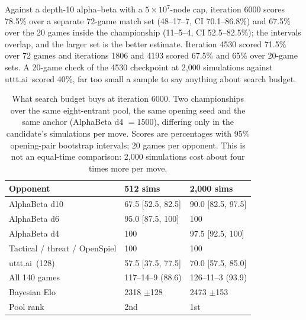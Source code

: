 \documentclass[conference]{IEEEtran}
\newcommand{\utttai}{uttt.ai}
\begin{document}
Against a depth-10 alpha--beta with a $5\times10^{7}$-node cap, iteration
6000 scores 78.5\% over a separate 72-game match set (48--17--7, CI
70.1--86.8\%) and 67.5\% over the 20 games inside the championship
(11--5--4, CI 52.5--82.5\%); the intervals overlap, and the larger set is
the better estimate. Iteration 4530 scored 71.5\% over 72 games and
iterations 1806 and 4193 scored 67.5\% and 65\% over 20-game sets. A
20-game check of the 4530 checkpoint at 2{,}000 simulations against \utttai\
scored 40\%, far too small a sample to say anything about search budget.



\begin{table}[t]
  \centering\footnotesize
  \setlength{\tabcolsep}{4pt}
  \caption{What search budget buys at iteration 6000. Two championships over
  the same eight-entrant pool, the same opening seed and the same anchor
  (AlphaBeta d4 $=1500$), differing only in the candidate's simulations per
  move. Scores are percentages with 95\% opening-pair bootstrap intervals;
  20 games per opponent. This is not an equal-time comparison: 2{,}000
  simulations cost about four times more per move.}
  \label{tab:budget}
  \begin{tabular}{@{}lll@{}}
    \toprule
    Opponent & 512 sims & 2{,}000 sims \\
    \midrule
    AlphaBeta d10 & 67.5 [52.5, 82.5] & 90.0 [82.5, 97.5] \\
    AlphaBeta d6 & 95.0 [87.5, 100] & 100 \\
    AlphaBeta d4 & 100 & 97.5 [92.5, 100] \\
    Tactical / threat / OpenSpiel & 100 & 100 \\
    \utttai\ (128) & 57.5 [37.5, 77.5] & 70.0 [57.5, 85.0] \\
    \midrule
    All 140 games & 117--14--9 (88.6) & 126--11--3 (93.9) \\
    Bayesian Elo & 2318 $\pm$128 & 2473 $\pm$153 \\
    Pool rank & 2nd & 1st \\
    \bottomrule
  \end{tabular}
\end{table}
\end{document}
